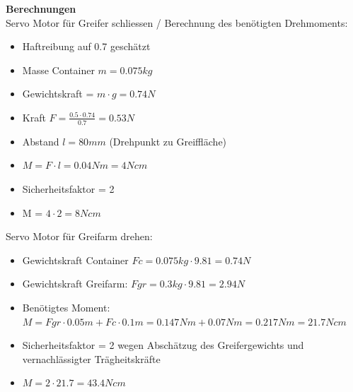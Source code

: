 \textbf{Berechnungen}\\[0.2cm]
Servo Motor für Greifer schliessen /
Berechnung des benötigten Drehmoments: 
\begin{itemize}
\item Haftreibung auf 0.7 geschätzt
\item Masse Container $m = 0.075kg$
\item Gewichtskraft = $m\cdot g = 0.74 N$
\item Kraft $F = \frac{0.5\cdot 0.74}{0.7} = 0.53 N$
\item Abstand $l = 80mm$ (Drehpunkt zu Greiffläche)
\item $M = F\cdot l = 0.04 Nm = 4 Ncm$
\item Sicherheitsfaktor = 2
\item M = $4\cdot 2 = 8 Ncm$
\end{itemize}
Servo Motor für Greifarm drehen:
\begin{itemize}
\item Gewichtskraft Container $Fc = 0.075kg\cdot 9.81 = 0.74 N$
\item Gewichtskraft Greifarm: $Fgr = 0.3kg\cdot 9.81 = 2.94 N$
\item Benötigtes Moment:
$M = Fgr\cdot 0.05m+Fc\cdot 0.1m = 0.147Nm+0.07Nm = 0.217Nm = 21.7Ncm$
\item Sicherheitsfaktor = 2 wegen Abschätzug des Greifergewichts und vernachlässigter Trägheitskräfte
\item $M = 2 \cdot 21.7 = 43.4 Ncm$
\end{itemize}